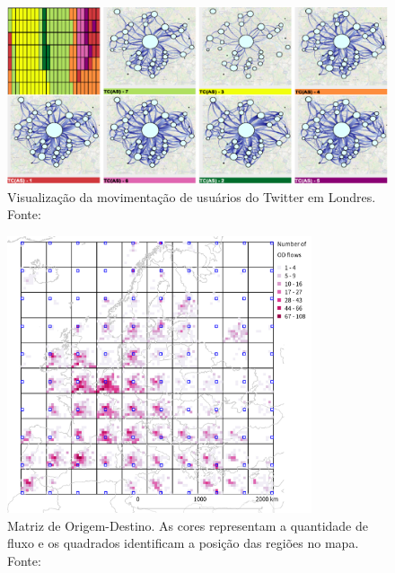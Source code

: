  \begin{figure}[!htb]
  \centering
  \includegraphics[width=\textwidth]{../figuras/clusters.png}
  \caption{Visualização da movimentação de usuários do Twitter em Londres. Fonte: \citet{Landersberg2016}}
   \label{fig:landersberg2016}
 \end{figure}

\begin{figure}[!htb]
  \centering
  \includegraphics[width=0.8\textwidth]{../figuras/anitaOD.png}
  \caption{Matriz de Origem-Destino. As cores representam a quantidade de fluxo e os quadrados identificam a posição das regiões no mapa. Fonte: \citet{Anita2017}}
   \label{fig:anitaOD}
 \end{figure}

